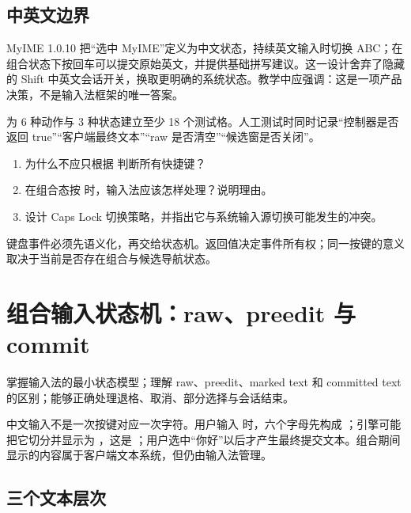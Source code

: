 \section{中英文边界}

MyIME 1.0.10 把“选中 MyIME”定义为中文状态，持续英文输入时切换 ABC；在组合状态下按回车可以提交原始英文，并提供基础拼写建议。这一设计舍弃了隐藏的 Shift 中英文会话开关，换取更明确的系统状态。教学中应强调：这是一项产品决策，不是输入法框架的唯一答案。

\begin{lab}[按键矩阵]
为 6 种动作与 3 种状态建立至少 18 个测试格。人工测试时同时记录“控制器是否返回 true”“客户端最终文本”“raw 是否清空”“候选窗是否关闭”。
\end{lab}

\exercises
\begin{enumerate}
  \item 为什么不应只根据  判断所有快捷键？
  \item 在组合态按  时，输入法应该怎样处理？说明理由。
  \item 设计 Caps Lock 切换策略，并指出它与系统输入源切换可能发生的冲突。
\end{enumerate}

\begin{summarybox}
键盘事件必须先语义化，再交给状态机。返回值决定事件所有权；同一按键的意义取决于当前是否存在组合与候选导航状态。
\end{summarybox}


\chapter{组合输入状态机：raw、preedit 与 commit}

\begin{goals}
掌握输入法的最小状态模型；理解 raw、preedit、marked text 和 committed text 的区别；能够正确处理退格、取消、部分选择与会话结束。
\end{goals}

中文输入不是一次按键对应一次字符。用户输入  时，六个字母先构成 ；引擎可能把它切分并显示为 ，这是 ；用户选中“你好”以后才产生最终提交文本。组合期间显示的内容属于客户端文本系统，但仍由输入法管理。


\section{三个文本层次}

